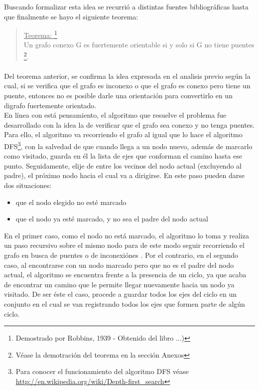 Buscando formalizar esta idea se recurrió a distintas fuentes bibliográficas hasta que finalmente se hayo el siguiente teorema:

\begin{quote}
\label{robbins}
\underline{Teorema: }\footnote{Demostrado por Robbins, 1939 - Obtenido del libro ...)}\\ \vspace{7pt}
Un grafo conexo G es fuertemente orientable si y solo si G no tiene puentes \footnote{Véase la demotración del teorema en la sección Anexos}.
\end{quote}

\paragraph{} 
Del teorema anterior, se confirma la idea expresada en el analisis previo según la cual, si se verifica que el grafo es inconexo o que el grafo es conexo pero tiene un puente, entonces no es posible darle una orientación para convertirlo en un digrafo fuertemente orientado.\\
En línea con está pensamiento, el algoritmo que resuelve el problema fue desarrollado con la idea la de verificar que el grafo sea conexo y no tenga puentes. Para ello, el algoritmo va recorriendo el grafo al igual que lo hace el algoritmo DFS\footnote{Para conocer el funcionamiento del algoritmo DFS véase \url{http://en.wikipedia.org/wiki/Depth-first_search}}, con la salvedad de que cuando llega a un nodo nuevo, además de marcarlo como visitado, guarda en él la lista de ejes que conforman el camino hasta ese punto. Seguidamente, elije de entre los vecinos del nodo actual (excluyendo al padre), el próximo nodo hacia el cual va a dirigirse. En este paso pueden darse dos situaciones: 
\begin{itemize}
	\item que el nodo elegido no esté marcado
	\item que el nodo ya esté marcado, y no sea el padre del nodo actual
\end{itemize}
En el primer caso, como el nodo no está marcado, el algoritmo lo toma y realiza un paso recursivo sobre el mismo nodo para de este modo seguir recorriendo el grafo en busca de puentes o de inconexiónes . Por el contrario, en el segundo caso, al encontrarse con un nodo marcado pero que no es el padre del nodo actual, el algoritmo se encuentra frente a la presencia de un ciclo, ya que acaba de encontrar un camino que le permite llegar nuevamente hacia un nodo ya visitado. De ser éste el caso, procede a guardar todos los ejes del ciclo en un conjunto en el cual se van registrando todos los ejes que formen parte de algún ciclo.
